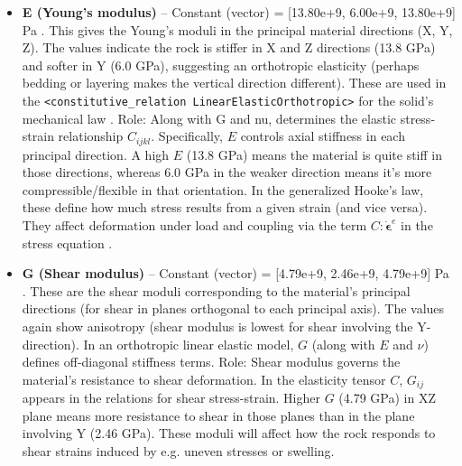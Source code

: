 \documentclass[10pt,a4paper]{article}
\begin{document}
\begin{itemize}
    \item \textbf{E (Young's modulus)} – Constant (vector) = [13.80e+9, 6.00e+9, 13.80e+9] Pa \cite{file:03_parameters_TRM}. This gives the Young's moduli in the principal material directions (X, Y, Z). The values indicate the rock is stiffer in X and Z directions (13.8 GPa) and softer in Y (6.0 GPa), suggesting an orthotropic elasticity (perhaps bedding or layering makes the vertical direction different). These are used in the \texttt{<constitutive\_relation LinearElasticOrthotropic>} for the solid's mechanical law \cite{file:01_processes_TRM}. Role: Along with G and nu, determines the elastic stress-strain relationship $C_{ijkl}$. Specifically, $E$ controls axial stiffness in each principal direction. A high $E$ (13.8 GPa) means the material is quite stiff in those directions, whereas 6.0 GPa in the weaker direction means it's more compressible/flexible in that orientation. In the generalized Hooke's law, these define how much stress results from a given strain (and vice versa). They affect deformation under load and coupling via the term $C:\dot{\boldsymbol{\epsilon}}^e$ in the stress equation \cite{ogs:trm}.

    \item \textbf{G (Shear modulus)} – Constant (vector) = [4.79e+9, 2.46e+9, 4.79e+9] Pa \cite{file:03_parameters_TRM}. These are the shear moduli corresponding to the material's principal directions (for shear in planes orthogonal to each principal axis). The values again show anisotropy (shear modulus is lowest for shear involving the Y-direction). In an orthotropic linear elastic model, $G$ (along with $E$ and $\nu$) defines off-diagonal stiffness terms. Role: Shear modulus governs the material's resistance to shear deformation. In the elasticity tensor $C$, $G_{ij}$ appears in the relations for shear stress-strain. Higher $G$ (4.79 GPa) in XZ plane means more resistance to shear in those planes than in the plane involving Y (2.46 GPa). These moduli will affect how the rock responds to shear strains induced by e.g. uneven stresses or swelling.


\end{itemize}
\end{document}
